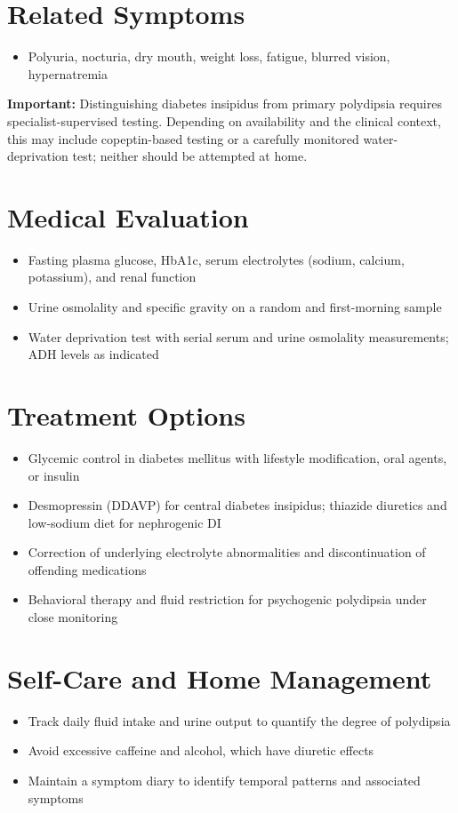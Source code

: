 \section*{Related Symptoms}
\begin{itemize}
  \item Polyuria, nocturia, dry mouth, weight loss, fatigue, blurred vision, hypernatremia
\end{itemize}
\textbf{Important:} Distinguishing diabetes insipidus from primary polydipsia requires specialist-supervised testing. Depending on availability and the clinical context, this may include copeptin-based testing or a carefully monitored water-deprivation test; neither should be attempted at home.

\section*{Medical Evaluation}
\begin{itemize}
  \item Fasting plasma glucose, HbA1c, serum electrolytes (sodium, calcium, potassium), and renal function
  \item Urine osmolality and specific gravity on a random and first-morning sample
  \item Water deprivation test with serial serum and urine osmolality measurements; ADH levels as indicated
\end{itemize}

\section*{Treatment Options}
\begin{itemize}
  \item Glycemic control in diabetes mellitus with lifestyle modification, oral agents, or insulin
  \item Desmopressin (DDAVP) for central diabetes insipidus; thiazide diuretics and low-sodium diet for nephrogenic DI
  \item Correction of underlying electrolyte abnormalities and discontinuation of offending medications
  \item Behavioral therapy and fluid restriction for psychogenic polydipsia under close monitoring
\end{itemize}

\section*{Self-Care and Home Management}
\begin{itemize}
  \item Track daily fluid intake and urine output to quantify the degree of polydipsia
  \item Avoid excessive caffeine and alcohol, which have diuretic effects
  \item Maintain a symptom diary to identify temporal patterns and associated symptoms
\end{itemize}

